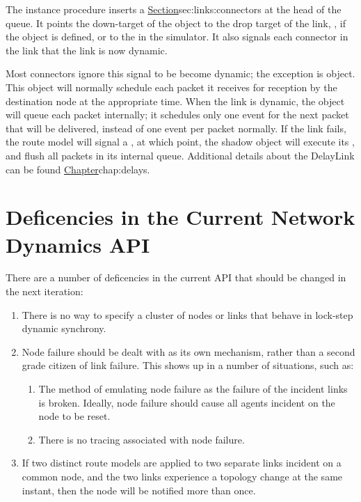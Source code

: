 The instance procedure  inserts a 
\href{DynamicLink object}{Section}{sec:links:connectors}
at the head of the queue.
It points the down-target of the object to the 
drop target of the link, , if the object is defined,
or to the  in the simulator.
It also signals each connector in the link that the link is now
dynamic.

Most connectors ignore this signal to be become dynamic;
the exception is  object.
This object will normally schedule each packet it receives
for reception by the destination node at the appropriate time.
When the link is dynamic, the object will queue each packet 
internally; it schedules only one event for the next packet
that will be delivered, instead of one event per packet normally.
If the link fails, the route model will signal a ,
at which point, the shadow object will execute its
,
and flush all packets in its internal queue.
Additional details about the DelayLink can be found
\href{in another chapter}{Chapter}{chap:delays}.

\section{Deficencies in the Current Network Dynamics API}
\label{sec:deficiencies}

There are a number of deficencies in the current API that should be
changed in the next iteration:
\begin{enumerate}
\item  There is no way to specify a cluster of nodes or links that
behave in lock-step dynamic synchrony.
\item  Node failure should be dealt with as its own mechanism,
rather than a second grade citizen of link failure.
This shows up in a number of situations, such as:
\begin{enumerate}
\item  The method of emulating node failure as the failure of the
incident links is broken.  Ideally, node failure should cause all
agents incident on the node to be reset.
\item  There is no tracing associated with node failure.
\end{enumerate}
\item  If two distinct route models are applied to two separate links
incident on a common node, and the two links experience a topology change
at the same instant, then the node will be notified more than once.
\end{enumerate}

\endinput

### Local Variables:
### mode: latex
### comment-column: 60
### backup-by-copying-when-linked: t
### file-precious-flag: nil
### End:
